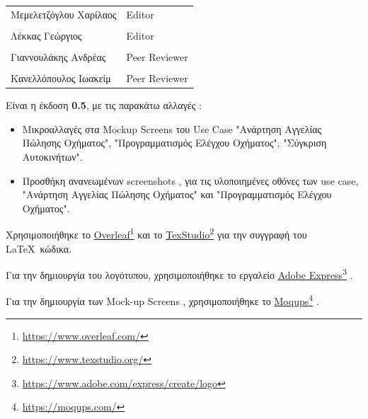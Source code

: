 \documentclass{../ol-softwaremanual}
\newcommand{\doclink}[2]{\href{#1}{#2}\footnote{\url{#1}}}
\begin{document}
	
	\vspace{20pt}
	
	\begin{table}[htbp!]
		\begin{tabular}{ll}
			Μεμελετζόγλου Χαρίλαος & \en Editor \\
			\\ Λέκκας Γεώργιος      &   \en  Editor \\
			\\ Γιαννουλάκης Ανδρέας & \en Peer Reviewer \\
			\\ Κανελλόπουλος Ιωακείμ & \en Peer Reviewer
		\end{tabular}
	\end{table}
	
	\vspace{10pt}
	\flushleft
	
	Είναι η έκδοση \textbf{0.5}, με τις παρακάτω αλλαγές :
	
	\begin{itemize}
		\item Μικροαλλαγές στα \en Mockup Screens \gr του \en Use Case "\gr Ανάρτηση Αγγελίας Πώλησης Οχήματος\en"\gr , \en"\gr Προγραμματισμός Ελέγχου Οχήματος\en"\gr , \en"\gr Σύγκριση Αυτοκινήτων\en"\gr. \break
		
		\item Προσθήκη ανανεωμένων \en screenshots \gr, για τις υλοποιημένες οθόνες των \en use case, "\gr Ανάρτηση Αγγελίας Πώλησης Οχήματος\en" \gr και \en"\gr Προγραμματισμός Ελέγχου Οχήματος\en"\gr .	
	\end{itemize}

	\newpage
	
	
	\vspace{20pt}
	\flushleft
	
	Χρησιμοποιήθηκε το \en \doclink{https://www.overleaf.com/}{Overleaf} \gr και το \en \doclink{https://www.texstudio.org/}{TexStudio} \gr για την συγγραφή του \LaTeX\ κώδικα. \break
	
	Για την δημιουργία του λογότυπου, χρησιμοποιήθηκε το εργαλείο \en \doclink{https://www.adobe.com/express/create/logo}{Adobe Express} . \gr \break
	
	Για την δημιουργία των \en Mock-up Screens \gr, χρησιμοποιήθηκε το \en \doclink{https://moqups.com/}{Moqups} \gr . \break
	
\end{document}
